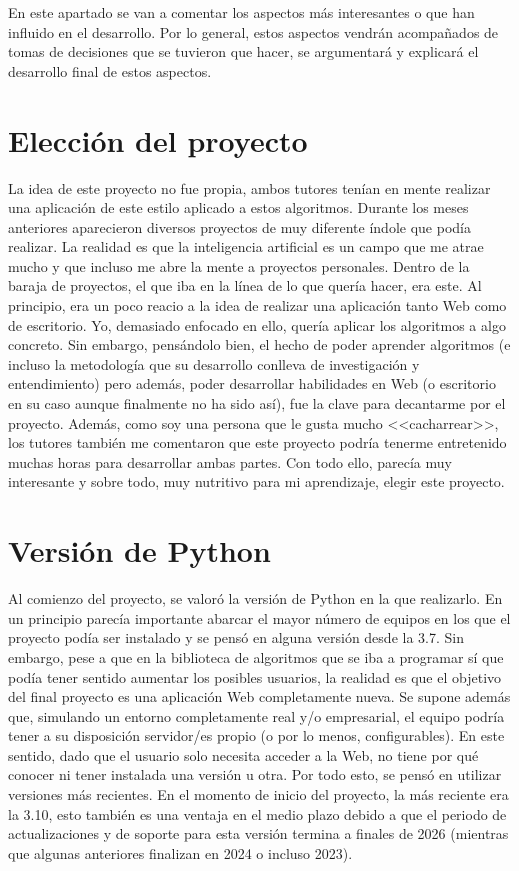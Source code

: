 
En este apartado se van a comentar los aspectos más interesantes o que han
influido en el desarrollo. Por lo general, estos aspectos vendrán acompañados de
tomas de decisiones que se tuvieron que hacer, se argumentará y explicará el
desarrollo final de estos aspectos.

\section{Elección del proyecto}

La idea de este proyecto no fue propia, ambos tutores tenían en mente realizar
una aplicación de este estilo aplicado a estos algoritmos. Durante los meses
anteriores aparecieron diversos proyectos de muy diferente índole que podía
realizar. La realidad es que la inteligencia artificial es un campo que me atrae
mucho y que incluso me abre la mente a proyectos personales. Dentro de la baraja
de proyectos, el que iba en la línea de lo que quería hacer, era este. Al
principio, era un poco reacio a la idea de realizar una aplicación tanto Web
como de escritorio. Yo, demasiado enfocado en ello, quería aplicar los
algoritmos a algo concreto. Sin embargo, pensándolo bien, el hecho de poder
aprender algoritmos (e incluso la metodología que su desarrollo conlleva de
investigación y entendimiento) pero además, poder desarrollar habilidades en Web
(o escritorio en su caso aunque finalmente no ha sido así), fue la clave para
decantarme por el proyecto. Además, como soy una persona que le gusta mucho
<<cacharrear>>, los tutores también me comentaron que este proyecto podría
tenerme entretenido muchas horas para desarrollar ambas partes. Con todo ello,
parecía muy interesante y sobre todo, muy nutritivo para mi aprendizaje, elegir
este proyecto.

\section{Versión de Python}

Al comienzo del proyecto, se valoró la versión de Python en la que realizarlo.
En un principio parecía importante abarcar el mayor número de equipos en los que
el proyecto podía ser instalado y se pensó en alguna versión desde la 3.7. Sin
embargo, pese a que en la biblioteca de algoritmos que se iba a programar sí que
podía tener sentido aumentar los posibles usuarios, la realidad es que el
objetivo del final proyecto es una aplicación Web completamente nueva. Se supone
además que, simulando un entorno completamente real y/o empresarial, el equipo
podría tener a su disposición servidor/es propio (o por lo menos,
configurables). En este sentido, dado que el usuario solo necesita acceder a la
Web, no tiene por qué conocer ni tener instalada una versión u otra. Por todo
esto, se pensó en utilizar versiones más recientes. En el momento de inicio del
proyecto, la más reciente era la 3.10, esto también es una ventaja en el medio
plazo debido a que el periodo de actualizaciones y de soporte para esta versión
termina a finales de 2026 (mientras que algunas anteriores finalizan en 2024 o
incluso 2023).

